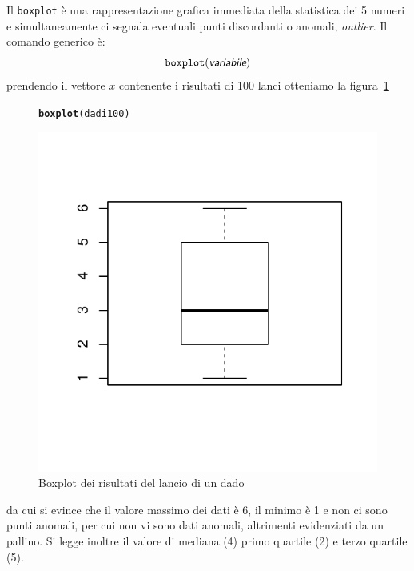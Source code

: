 \documentclass[onecolumn,12pt]{book}\usepackage[]{graphicx}\usepackage[]{color}
\makeatletter
\def\maxwidth{ %
  \ifdim\Gin@nat@width>\linewidth
    \linewidth
  \else
    \Gin@nat@width
  \fi
}
\newcommand{\hlstd}[1]{\textcolor[rgb]{0.345,0.345,0.345}{#1}}%
\newcommand{\hlkwd}[1]{\textcolor[rgb]{0.737,0.353,0.396}{\textbf{#1}}}%
\newenvironment{kframe}{%
 \def\at@end@of@kframe{}%
 \ifinner\ifhmode%
  \def\at@end@of@kframe{\end{minipage}}%
  \begin{minipage}{\columnwidth}%
 \fi\fi%
 \def\FrameCommand##1{\hskip\@totalleftmargin \hskip-\fboxsep
 \colorbox{shadecolor}{##1}\hskip-\fboxsep
     \hskip-\linewidth \hskip-\@totalleftmargin \hskip\columnwidth}%
 \MakeFramed {\advance\hsize-\width
   \@totalleftmargin\z@ \linewidth\hsize
   \@setminipage}}%
 {\par\unskip\endMakeFramed%
 \at@end@of@kframe}
\newenvironment{knitrout}{}{} %
\newcommand{\varia}[1]{\textsl{\textsf{#1}}}
\makeatother
\begin{document}
Il \texttt{boxplot}  \`e una rappresentazione grafica immediata della statistica dei 5 numeri e simultaneamente ci  segnala eventuali punti discordanti o anomali, {\it outlier}.
Il comando generico \`e: \begin{equation}\texttt{boxplot}(\varia{variabile})\end{equation}
prendendo il vettore $x$ contenente i risultati di 100 lanci
otteniamo la figura~\ref{fig:boxplotdado}
\begin{figure}[htbp]
\begin{center}
\begin{knitrout}
\color{fgcolor}\begin{kframe}
\begin{alltt}
\hlkwd{boxplot}\hlstd{(dadi100)}
\end{alltt}
\end{kframe}
\includegraphics[width=\maxwidth]{figure/unnamed-chunk-111-1} 

\end{knitrout}
\caption{Boxplot dei risultati del lancio di un dado}
\label{fig:boxplotdado}
\end{center}
\end{figure}
da cui si evince che il valore massimo dei dati \`e 6, il minimo \`e 1 e non ci sono punti anomali, per cui non vi sono dati anomali, altrimenti evidenziati da un pallino. Si legge inoltre il valore di mediana (4) primo quartile (2) e terzo quartile (5).
\end{document}
